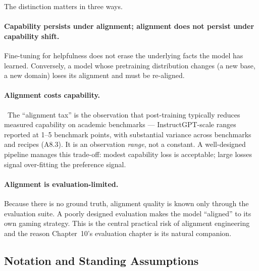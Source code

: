 The distinction matters in three ways.

\paragraph{Capability persists under alignment; alignment does not
persist under capability shift.} Fine-tuning for helpfulness does
not erase the underlying facts the model has learned. Conversely, a
model whose pretraining distribution changes (a new base, a new
domain) loses its alignment and must be re-aligned.

\paragraph{Alignment costs capability.} \Emp\ The ``alignment tax''
\citep{ouyang2022training} is the observation that post-training
typically reduces measured capability on academic benchmarks ---
InstructGPT-scale ranges reported at 1--5 benchmark points, with
substantial variance across benchmarks and recipes (A8.3). It is an
observation \emph{range}, not a constant. A well-designed pipeline
manages this trade-off: modest capability loss is acceptable; large
losses signal over-fitting the preference signal.

\paragraph{Alignment is evaluation-limited.} Because there is no
ground truth, alignment quality is known only through the evaluation
suite. A poorly designed evaluation makes the model ``aligned'' to
its own gaming strategy. This is the central practical risk of
alignment engineering and the reason Chapter~10's evaluation chapter is
its natural companion.

\subsection{Notation and Standing Assumptions}
\label{sec:week8-notation}

